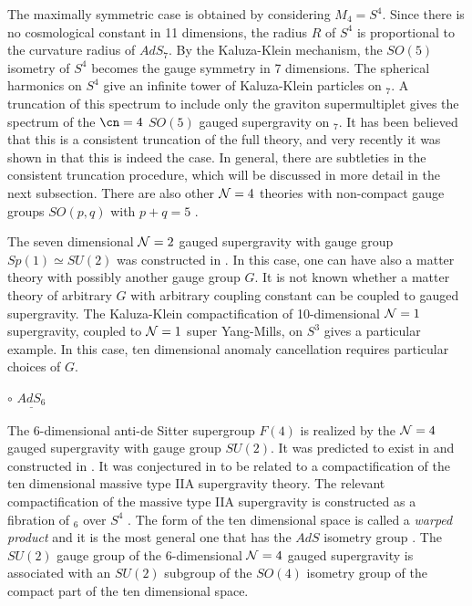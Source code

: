 The maximally symmetric case is obtained by considering
$M_4=S^4$. Since there is no cosmological constant
in 11 dimensions, the radius $R$ of $S^4$ is
proportional to the curvature radius of $AdS_7$. 
By the Kaluza-Klein mechanism, 
the $SO(5)$ isometry of $S^4$ becomes the
gauge symmetry in 7 dimensions. The spherical harmonics
on $S^4$ give an infinite tower of Kaluza-Klein particles 
on \ads$_7$. 
A truncation of this spectrum to include only the graviton
supermultiplet gives the spectrum of the $\cn=4$ $SO(5)$ gauged
supergravity on \ads$_7$. It has been believed 
that this is a consistent truncation of the full theory, and 
very recently it was shown in \cite{vN:99ct} that this
is indeed the case. In general, there
are subtleties in the consistent truncation procedure, 
which will be discussed
in more detail in the next subsection. There are also 
other ${\cal N}=4$ theories with non-compact gauge groups $SO(p,q)$ with
$p+q=5$ \cite{Pernici:1985zw}.

The seven dimensional ${\cal N}=2$ gauged supergravity with gauge
group $Sp(1) \simeq SU(2)$ was constructed in \cite{Townsend:1983kk}.
In this case, one can have also a matter theory with possibly another
gauge group $G$. It is not known whether a matter theory of arbitrary
$G$ with arbitrary coupling constant can be coupled to gauged
supergravity. The Kaluza-Klein compactification of 10-dimensional
${\cal N}=1$ supergravity, coupled to ${\cal N}=1$ super Yang-Mills,
on $S^3$ gives a particular example. In this case, ten dimensional
anomaly cancellation requires particular choices of $G$.

\medskip
\noindent
$\circ$ $\underline{AdS_6}$

The 6-dimensional anti-de Sitter supergroup $F(4)$ is
realized by the ${\cal N}=4$ gauged supergravity with
gauge group $SU(2)$.
It was predicted to exist in \cite{DeWitt:1982wm} and
constructed in \cite{Romans:1986tw}.
It was
conjectured in \cite{Ferrara:1998gv} to be related
to a compactification of the ten dimensional massive type IIA supergravity theory.
The relevant compactification
of the massive type IIA supergravity is constructed as
a fibration
of  \ads$_6$ over $S^4$ \cite{us:1999ma}. The form of the ten dimensional space is
called a 
{\it warped product}
\cite{vanNieuwenhuizen:1985ri} and it is the most general one that has the 
$AdS$
isometry group \cite{van:1983xx}.
The $SU(2)$ gauge group of  
the 6-dimensional ${\cal N}=4$ gauged supergravity is associated with an $SU(2)$ subgroup
of the  $SO(4)$ isometry group of the compact part of the ten dimensional
space.



